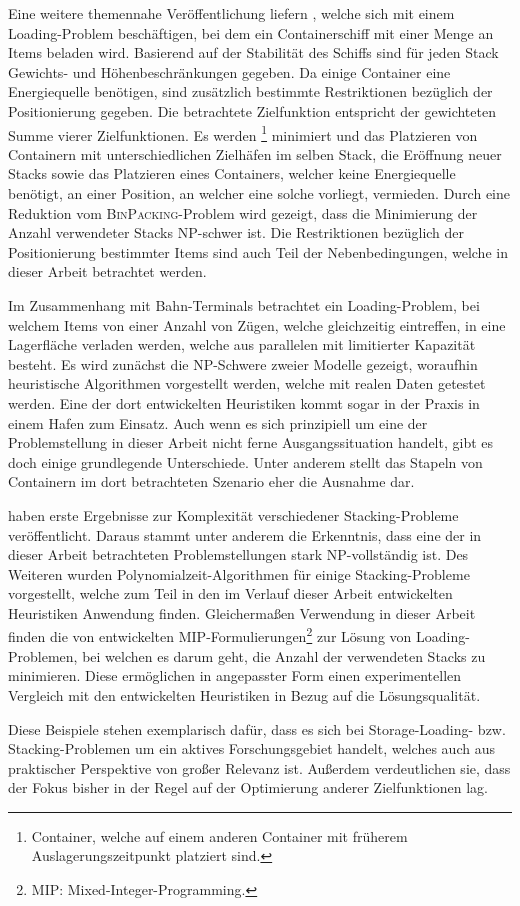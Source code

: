 Eine weitere themennahe Veröffentlichung liefern \citet{Delgado2012}, welche sich mit einem
Loading-Problem beschäftigen, bei dem ein Containerschiff mit einer Menge an Items beladen wird.
Basierend auf der Stabilität des Schiffs sind für jeden Stack Gewichts- und Höhenbeschränkungen gegeben.
Da einige Container eine Energiequelle benötigen, sind zusätzlich bestimmte Restriktionen bezüglich der
Positionierung gegeben.
Die betrachtete Zielfunktion entspricht der gewichteten Summe vierer Zielfunktionen.
Es werden \footnote{Container, welche auf einem anderen Container mit früherem Auslagerungszeitpunkt platziert sind.} minimiert und das Platzieren von Containern mit unterschiedlichen Zielhäfen
im selben Stack, die Eröffnung neuer Stacks sowie das Platzieren eines Containers,
welcher keine Energiequelle benötigt, an einer Position, an welcher eine solche vorliegt, vermieden.
Durch eine Reduktion vom \textsc{BinPacking}-Problem wird gezeigt,
dass die Minimierung der Anzahl verwendeter Stacks NP-schwer ist.
Die Restriktionen bezüglich der Positionierung bestimmter Items sind auch Teil der Nebenbedingungen,
welche in dieser Arbeit betrachtet werden.

Im Zusammenhang mit Bahn-Terminals betrachtet \citet{Jaehn2013} ein Loading-Problem,
bei welchem Items von einer Anzahl von Zügen, welche gleichzeitig eintreffen,
in eine Lagerfläche verladen werden, welche aus parallelen  mit limitierter Kapazität besteht.
Es wird zunächst die NP-Schwere zweier Modelle gezeigt, woraufhin heuristische Algorithmen vorgestellt werden,
welche mit realen Daten getestet werden. Eine der dort entwickelten Heuristiken kommt sogar in der Praxis
in einem Hafen zum Einsatz. Auch wenn es sich prinzipiell um eine der Problemstellung in dieser
Arbeit nicht ferne Ausgangssituation handelt, gibt es doch einige grundlegende Unterschiede.
Unter anderem stellt das Stapeln von Containern im dort betrachteten Szenario eher die Ausnahme dar.

\vfill
\pagebreak

\citet{Bruns2015} haben erste Ergebnisse zur Komplexität verschiedener Stacking-Probleme veröffentlicht.
Daraus stammt unter anderem die Erkenntnis, dass eine der in dieser Arbeit betrachteten Problemstellungen stark NP-vollständig ist.
Des Weiteren wurden Polynomialzeit-Algorithmen für einige Stacking-Probleme vorgestellt,
welche zum Teil in den im Verlauf dieser Arbeit entwickelten Heuristiken Anwendung finden.\newline
Gleichermaßen Verwendung in dieser Arbeit finden die von \citet{Le2016} entwickelten
MIP-Formulierungen\footnote{MIP: Mixed-Integer-Programming.} zur Lösung von Loading-Problemen, bei welchen es darum geht,
die Anzahl der verwendeten Stacks zu minimieren. Diese ermöglichen in angepasster Form einen experimentellen Vergleich mit
den entwickelten Heuristiken in Bezug auf die Lösungsqualität.

Diese Beispiele stehen exemplarisch dafür, dass es sich bei Storage-Loading- bzw. Stacking-Problemen um
ein aktives Forschungsgebiet handelt, welches auch aus praktischer Perspektive von großer Relevanz ist.
Außerdem verdeutlichen sie, dass der Fokus bisher in der Regel auf der Optimierung anderer Zielfunktionen lag.

\vfill
\pagebreak
